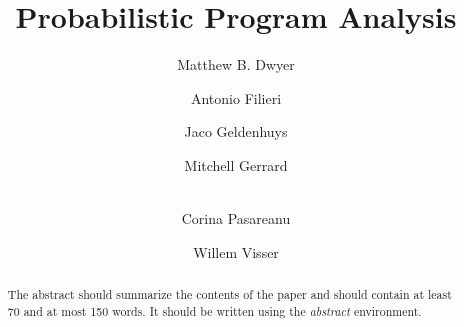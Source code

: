 \documentclass[runningheads,a4paper]{llncs}
\begin{document}
\mainmatter  %

\newcommand{\mycomment}[1]{\textit{\textcolor{red}{#1}}}
\newcommand{\ignore}[1]{}

\title{Probabilistic Program Analysis}


\author{Matthew B. Dwyer
\and Antonio Filieri\and Jaco Geldenhuys\and Mitchell Gerrard\and\\
Corina Pasareanu\and Willem Visser}
%


%
%

\maketitle


\begin{abstract}
The abstract should summarize the contents of the paper and should
contain at least 70 and at most 150 words. It should be written using the
\emph{abstract} environment.
\keywords{}
\end{abstract}












\end{document}
